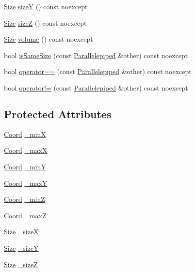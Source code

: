 \begin{DoxyCompactItemize}
\item 
\hyperlink{struct_size}{Size} \hyperlink{struct_parallelepiped_a4dd40c102d8f16473ce2de8a5a93e102}{size\-Y} () const noexcept
\item 
\hyperlink{struct_size}{Size} \hyperlink{struct_parallelepiped_ab259bb38f5743f1f33738f4774b33848}{size\-Z} () const noexcept
\item 
\hyperlink{struct_size}{Size} \hyperlink{struct_parallelepiped_a0862330294ca2ca177308d2fef56dffa}{volume} () const noexcept
\item 
bool \hyperlink{struct_parallelepiped_a1233e1b19767f80b991b2dc4a9e20146}{is\-Same\-Size} (const \hyperlink{struct_parallelepiped}{Parallelepiped} \&other) const noexcept
\item 
bool \hyperlink{struct_parallelepiped_afe121f86b46f64ebd388351ff4f06440}{operator==} (const \hyperlink{struct_parallelepiped}{Parallelepiped} \&other) const noexcept
\item 
bool \hyperlink{struct_parallelepiped_ab7c62b8191d9e9f5c61adb90d8042c2e}{operator!=} (const \hyperlink{struct_parallelepiped}{Parallelepiped} \&other) const noexcept
\end{DoxyCompactItemize}
\subsection*{Protected Attributes}
\begin{DoxyCompactItemize}
\item 
\hyperlink{struct_coord}{Coord} \hyperlink{struct_parallelepiped_a0f5449743f2123c17167b7f7c72ef1bb}{\-\_\-min\-X}
\item 
\hyperlink{struct_coord}{Coord} \hyperlink{struct_parallelepiped_a4dbb9c56d7fe012c596ce7d1895b61ff}{\-\_\-max\-X}
\item 
\hyperlink{struct_coord}{Coord} \hyperlink{struct_parallelepiped_a5771e43afdf839db265e15405cb2cf06}{\-\_\-min\-Y}
\item 
\hyperlink{struct_coord}{Coord} \hyperlink{struct_parallelepiped_aaed9c078439f031300ffab10c88fbac5}{\-\_\-max\-Y}
\item 
\hyperlink{struct_coord}{Coord} \hyperlink{struct_parallelepiped_a236bbf5d0a7354f2f8c11566a9552631}{\-\_\-min\-Z}
\item 
\hyperlink{struct_coord}{Coord} \hyperlink{struct_parallelepiped_a4f3f924bce7e2d0531e169a2cddc3772}{\-\_\-max\-Z}
\item 
\hyperlink{struct_size}{Size} \hyperlink{struct_parallelepiped_abff135261e4f3e6e8ea9c6dd185de0cd}{\-\_\-size\-X}
\item 
\hyperlink{struct_size}{Size} \hyperlink{struct_parallelepiped_a722af4ec16bb4ede57cb73a527d16dbf}{\-\_\-size\-Y}
\item 
\hyperlink{struct_size}{Size} \hyperlink{struct_parallelepiped_a99b032966bf653c13ca8d9645ad14b5e}{\-\_\-size\-Z}
\end{DoxyCompactItemize}


